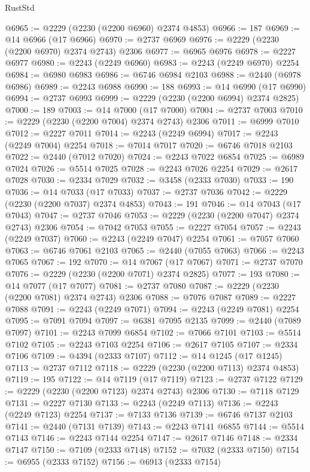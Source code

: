 \begin{lexlean}{RustStd}
\begin{coremodule}
@6965 := @2229 (@2230 (@2200 @6960) @2374 @4853)
@6966 := 187
@6969 := @14 @6966 (@17 @6966)
@6970 := @2737 @6969
@6976 := @2229 (@2230 (@2200 @6970) @2374 @2743) @2306
@6977 := @6965 @6976
@6978 := @2227 @6977
@6980 := @2243 (@2249 @6960)
@6983 := @2243 (@2249 @6970) @2254
@6984 := @6980 @6983
@6986 := @6746 @6984 @2103
@6988 := @2440 (@6978 @6986)
@6989 := @2243 @6988
@6990 := 188
@6993 := @14 @6990 (@17 @6990)
@6994 := @2737 @6993
@6999 := @2229 (@2230 (@2200 @6994) @2374 @2825)
@7000 := 189
@7003 := @14 @7000 (@17 @7000)
@7004 := @2737 @7003
@7010 := @2229 (@2230 (@2200 @7004) @2374 @2743) @2306
@7011 := @6999 @7010
@7012 := @2227 @7011
@7014 := @2243 (@2249 @6994)
@7017 := @2243 (@2249 @7004) @2254
@7018 := @7014 @7017
@7020 := @6746 @7018 @2103
@7022 := @2440 (@7012 @7020)
@7024 := @2243 @7022 @6854
@7025 := @6989 @7024
@7026 := @5514 @7025
@7028 := @2243 @7026 @2254
@7029 := @2617 @7028
@7030 := @2334 @7029
@7032 := @3458 (@2333 @7030)
@7033 := 190
@7036 := @14 @7033 (@17 @7033)
@7037 := @2737 @7036
@7042 := @2229 (@2230 (@2200 @7037) @2374 @4853)
@7043 := 191
@7046 := @14 @7043 (@17 @7043)
@7047 := @2737 @7046
@7053 := @2229 (@2230 (@2200 @7047) @2374 @2743) @2306
@7054 := @7042 @7053
@7055 := @2227 @7054
@7057 := @2243 (@2249 @7037)
@7060 := @2243 (@2249 @7047) @2254
@7061 := @7057 @7060
@7063 := @6746 @7061 @2103
@7065 := @2440 (@7055 @7063)
@7066 := @2243 @7065
@7067 := 192
@7070 := @14 @7067 (@17 @7067)
@7071 := @2737 @7070
@7076 := @2229 (@2230 (@2200 @7071) @2374 @2825)
@7077 := 193
@7080 := @14 @7077 (@17 @7077)
@7081 := @2737 @7080
@7087 := @2229 (@2230 (@2200 @7081) @2374 @2743) @2306
@7088 := @7076 @7087
@7089 := @2227 @7088
@7091 := @2243 (@2249 @7071)
@7094 := @2243 (@2249 @7081) @2254
@7095 := @7091 @7094
@7097 := @6381 @7095 @2135
@7099 := @2440 (@7089 @7097)
@7101 := @2243 @7099 @6854
@7102 := @7066 @7101
@7103 := @5514 @7102
@7105 := @2243 @7103 @2254
@7106 := @2617 @7105
@7107 := @2334 @7106
@7109 := @4394 (@2333 @7107)
@7112 := @14 @1245 (@17 @1245)
@7113 := @2737 @7112
@7118 := @2229 (@2230 (@2200 @7113) @2374 @4853)
@7119 := 195
@7122 := @14 @7119 (@17 @7119)
@7123 := @2737 @7122
@7129 := @2229 (@2230 (@2200 @7123) @2374 @2743) @2306
@7130 := @7118 @7129
@7131 := @2227 @7130
@7133 := @2243 (@2249 @7113)
@7136 := @2243 (@2249 @7123) @2254
@7137 := @7133 @7136
@7139 := @6746 @7137 @2103
@7141 := @2440 (@7131 @7139)
@7143 := @2243 @7141 @6855
@7144 := @5514 @7143
@7146 := @2243 @7144 @2254
@7147 := @2617 @7146
@7148 := @2334 @7147
@7150 := @7109 (@2333 @7148)
@7152 := @7032 (@2333 @7150)
@7154 := @6955 (@2333 @7152)
@7156 := @6913 (@2333 @7154)

\end{coremodule}
\end{lexlean}
